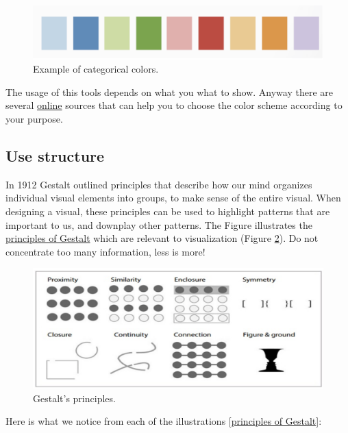 \begin{figure}[H]%
 \centering
 \includegraphics[width=13cm]{./img/06/categorical}
 \caption{\label{pic:categorical} Example of categorical colors.}
\end{figure}

The usage of this tools depends on what you what to show. Anyway there are several \href{http://colorbrewer2.org/#type=sequential\&scheme=BuGn\&n=3}{online} sources that can help you to choose the color scheme according to your purpose.

\subsection*{Use structure}

In 1912 Gestalt outlined principles that describe how our mind organizes individual visual elements into groups, to make sense of the entire visual. When designing a visual, these principles can be used to highlight patterns that are important to us, and downplay other patterns. The Figure  illustrates the \href{http://www.fusioncharts.com/blog/2014/03/how-to-use-the-gestalt-principles-for-visual-storytelling-podv/}{principles of Gestalt} which are relevant to visualization (Figure \ref{pic:gestalt}). Do not concentrate too many information, less is more!

\begin{figure}[H]%
 \centering
 \includegraphics[width=13cm]{./img/06/gestalt}
 \caption{\label{pic:gestalt} Gestalt's principles.}
\end{figure}

Here is what we notice from each of the illustrations [\href{http://www.fusioncharts.com/blog/2014/03/how-to-use-the-gestalt-principles-for-visual-storytelling-podv/}{principles of Gestalt}]:

